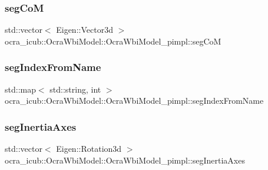 \hypertarget{structOcraWbiModel_1_1OcraWbiModel__pimpl_af244a33c7309714ca793d29247ead8b8}{}\label{structOcraWbiModel_1_1OcraWbiModel__pimpl_af244a33c7309714ca793d29247ead8b8} 
\subsubsection{\texorpdfstring{seg\+CoM}{segCoM}}
{\footnotesize\ttfamily std\+::vector$<$ Eigen\+::\+Vector3d $>$ ocra\+\_\+icub\+::\+Ocra\+Wbi\+Model\+::\+Ocra\+Wbi\+Model\+\_\+pimpl\+::seg\+CoM}

\hypertarget{structOcraWbiModel_1_1OcraWbiModel__pimpl_ad172a7f70ea862fa849e859dc3c8e4f1}{}\label{structOcraWbiModel_1_1OcraWbiModel__pimpl_ad172a7f70ea862fa849e859dc3c8e4f1} 
\subsubsection{\texorpdfstring{seg\+Index\+From\+Name}{segIndexFromName}}
{\footnotesize\ttfamily std\+::map$<$ std\+::string, int $>$ ocra\+\_\+icub\+::\+Ocra\+Wbi\+Model\+::\+Ocra\+Wbi\+Model\+\_\+pimpl\+::seg\+Index\+From\+Name}

\hypertarget{structOcraWbiModel_1_1OcraWbiModel__pimpl_aba2d3ed2e0c2a1a1b8b4d40c3df6a4a5}{}\label{structOcraWbiModel_1_1OcraWbiModel__pimpl_aba2d3ed2e0c2a1a1b8b4d40c3df6a4a5} 
\subsubsection{\texorpdfstring{seg\+Inertia\+Axes}{segInertiaAxes}}
{\footnotesize\ttfamily std\+::vector$<$ Eigen\+::\+Rotation3d $>$ ocra\+\_\+icub\+::\+Ocra\+Wbi\+Model\+::\+Ocra\+Wbi\+Model\+\_\+pimpl\+::seg\+Inertia\+Axes}

